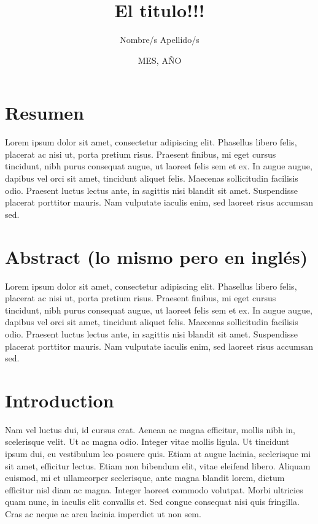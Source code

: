 \documentclass[a4paper,12pt]{article}
\title{El titulo!!!}
\author{Nombre/s Apellido/s}
\date{MES, AÑO} %
\begin{document}
\maketitle

\section*{Resumen}

Lorem ipsum dolor sit amet, consectetur adipiscing elit. Phasellus libero felis, placerat ac nisi ut, porta pretium risus. Praesent finibus, mi eget cursus tincidunt, nibh purus consequat augue, ut laoreet felis sem et ex. In augue augue, dapibus vel orci sit amet, tincidunt aliquet felis. Maecenas sollicitudin facilisis odio. Praesent luctus lectus ante, in sagittis nisi blandit sit amet. Suspendisse placerat porttitor mauris. Nam vulputate iaculis enim, sed laoreet risus accumsan sed.

\section*{Abstract (lo mismo pero en inglés)}

Lorem ipsum dolor sit amet, consectetur adipiscing elit. Phasellus libero felis, placerat ac nisi ut, porta pretium risus. Praesent finibus, mi eget cursus tincidunt, nibh purus consequat augue, ut laoreet felis sem et ex. In augue augue, dapibus vel orci sit amet, tincidunt aliquet felis. Maecenas sollicitudin facilisis odio. Praesent luctus lectus ante, in sagittis nisi blandit sit amet. Suspendisse placerat porttitor mauris. Nam vulputate iaculis enim, sed laoreet risus accumsan sed.

\clearpage
\tableofcontents
\clearpage

\section{Introduction}

Nam vel luctus dui, id cursus erat. Aenean ac magna efficitur, mollis nibh in, scelerisque velit. Ut ac magna odio. Integer vitae mollis ligula. Ut tincidunt ipsum dui, eu vestibulum leo posuere quis. Etiam at augue lacinia, scelerisque mi sit amet, efficitur lectus. Etiam non bibendum elit, vitae eleifend libero. Aliquam euismod, mi et ullamcorper scelerisque, ante magna blandit lorem, dictum efficitur nisl diam ac magna. Integer laoreet commodo volutpat. Morbi ultricies quam nunc, in iaculis elit convallis et. Sed congue consequat nisi quis fringilla. Cras ac neque ac arcu lacinia imperdiet ut non sem.
\end{document}
